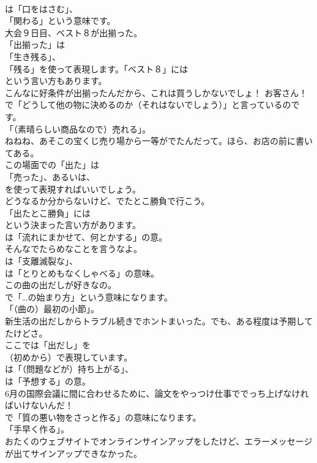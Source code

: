 \documentclass[8pt]{extreport}
\begin{document}
\begin{CJK}{UTF8}{min}
\\	は「口をはさむ」、
\\	「関わる」という意味です。	
\\	大会９日目、ベスト８が出揃った。 
\\	「出揃った」は
\\	「生き残る」、
\\	「残る」を使って表現します。「ベスト８」には
\\	という言い方もあります。	
\\	こんなに好条件が出揃ったんだから、これは買うしかないでしょ！ お客さん！ 
\\	で「どうして他の物に決めるのか（それはないでしょう）」と言っているのです。
\\	「（素晴らしい商品なので）売れる」。	
\\	ねねね、あそこの宝くじ売り場から一等がでたんだって。ほら、お店の前に書いてある。 
\\	この場面での「出た」は
\\	「売った」、あるいは、
\\	を使って表現すればいいでしょう。	
\\	どうなるか分からないけど、でたとこ勝負で行こう。 
\\	「出たとこ勝負」には
\\	という決まった言い方があります。
\\	は「流れにまかせて、何とかする」の意。	
\\	そんなでたらめなことを言うなよ。 
\\	は「支離滅裂な」、
\\	は「とりとめもなくしゃべる」の意味。	
\\	この曲の出だしが好きなの。 
\\	で「…の始まり方」という意味になります。
\\	「（曲の）最初の小節」。	
\\	新生活の出だしからトラブル続きでホントまいった。でも、ある程度は予期してたけどさ。 
\\	ここでは「出だし」を 
\\	（初めから）で表現しています。
\\	は「（問題などが）持ち上がる」、
\\	は「予想する」の意。	
\\	6月の国際会議に間に合わせるために、論文をやっつけ仕事ででっち上げなければいけないんだ！ 
\\	で「質の悪い物をさっと作る」の意味になります。
\\	「手早く作る」。	
\\	おたくのウェブサイトでオンラインサインアップをしたけど、エラーメッセージが出てサインアップできなかった。 

\end{CJK}
\end{document}
